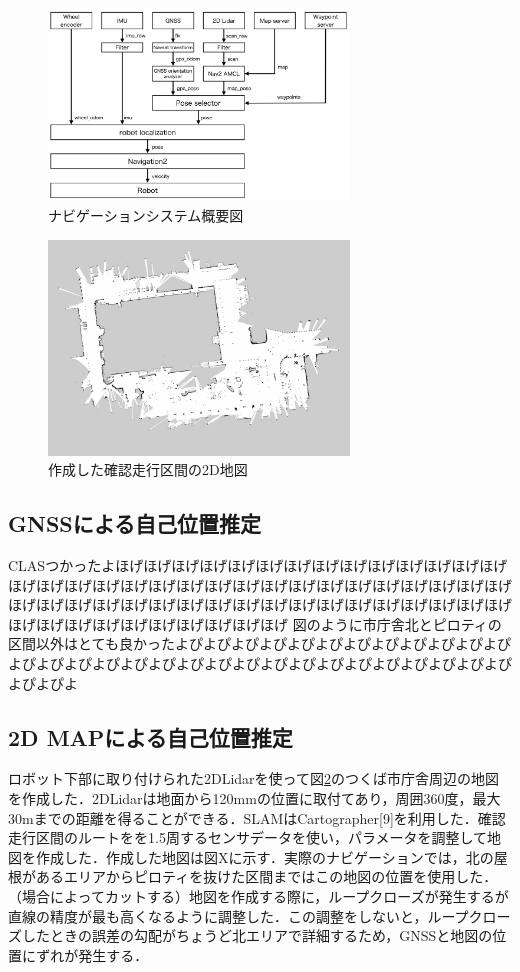 \documentclass[platex,dvipdfmx]{rbproceedings}
\begin{document}
\begin{figure}[htbp]
    \centering   
    \includegraphics[keepaspectratio,width=80mm]{fig/system.png}
    \caption{ナビゲーションシステム概要図}
    \label{fig:system}
\end{figure}

\begin{figure}[h]
    \centering   
    \includegraphics[keepaspectratio,width=80mm]{fig/map.png}
    \caption{作成した確認走行区間の2D地図}
    \label{fig:map}
\end{figure}

\subsection{GNSSによる自己位置推定}
CLASつかったよほげほげほげほげほげほげほげほげほげほげほげほげほげほげほげほげほげほげほげほげほげほげほげほげほげほげほげほげほげほげほげほげほげほげほげほげほげほげほげほげほげほげほげほげほげほげほげほげほげほげほげほげほげほげほげほげほげほげほげほげ
図のように市庁舎北とピロティの区間以外はとても良かったよぴよぴよぴよぴよぴよぴよぴよぴよぴよぴよぴよぴよぴよぴよぴよぴよぴよぴよぴよぴよぴよぴよぴよぴよぴよぴよぴよぴよぴよぴよぴよぴよ

\subsection{2D MAPによる自己位置推定}
ロボット下部に取り付けられた2DLidarを使って図\ref{fig:map}のつくば市庁舎周辺の地図を作成した．2DLidarは地面から120mmの位置に取付てあり，周囲360度，最大30mまでの距離を得ることができる．SLAMはCartographer[9]を利用した．確認走行区間のルートをを1.5周するセンサデータを使い，パラメータを調整して地図を作成した．作成した地図は図Xに示す．実際のナビゲーションでは，北の屋根があるエリアからピロティを抜けた区間まではこの地図の位置を使用した．
（場合によってカットする）地図を作成する際に，ループクローズが発生するが直線の精度が最も高くなるように調整した．この調整をしないと，ループクローズしたときの誤差の勾配がちょうど北エリアで詳細するため，GNSSと地図の位置にずれが発生する．
\end{document}

